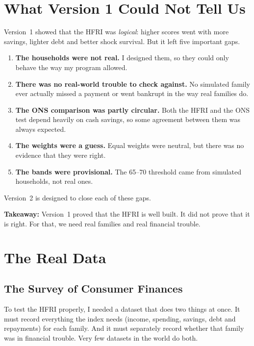 \documentclass[11pt,a4paper]{article}
\newcommand{\takeaway}[1]{\par\smallskip\noindent\textbf{Takeaway:} #1\par\smallskip}
\begin{document}
\section{What Version 1 Could Not Tell Us}
Version~1 showed that the HFRI was \emph{logical}: higher scores went with more savings, lighter debt and better shock
survival. But it left five important gaps.
\begin{enumerate}
\item \textbf{The households were not real.} I designed them, so they could only behave the way my program allowed.
\item \textbf{There was no real-world trouble to check against.} No simulated family ever actually missed a payment or
went bankrupt in the way real families do.
\item \textbf{The ONS comparison was partly circular.} Both the HFRI and the ONS test depend heavily on cash savings, so
some agreement between them was always expected.
\item \textbf{The weights were a guess.} Equal weights were neutral, but there was no evidence that they were right.
\item \textbf{The bands were provisional.} The 65--70 threshold came from simulated households, not real ones.
\end{enumerate}
Version~2 is designed to close each of these gaps.

\takeaway{Version~1 proved that the HFRI is well built. It did not prove that it is right. For that, we need real
families and real financial trouble.}

\begin{center}
\vspace{6pt}{\Large\bfseries Part II: Testing the HFRI on Real Families}\vspace{4pt}
\end{center}

\section{The Real Data}
\subsection{The Survey of Consumer Finances}
To test the HFRI properly, I needed a dataset that does two things at once. It must record everything the index needs
(income, spending, savings, debt and repayments) for each family. And it must separately record whether that family
was in financial trouble. Very few datasets in the world do both.
\end{document}
